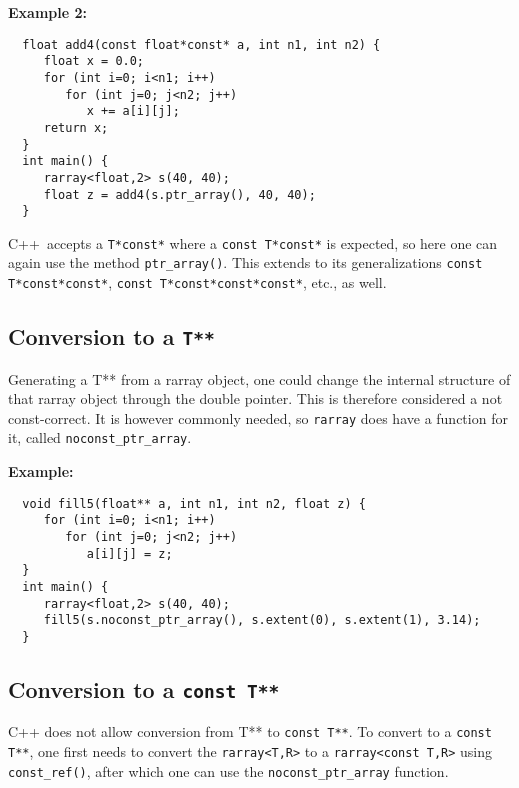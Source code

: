 \documentclass[11pt,twoside]{article}
\newcommand{\cxx}{C{++}}
\begin{document}
\noindent
{\bf Example 2:}
\vspace{-5pt}\begin{framed}\vspace{-14pt}%
\begin{verbatim}
  float add4(const float*const* a, int n1, int n2) {
     float x = 0.0;
     for (int i=0; i<n1; i++)
        for (int j=0; j<n2; j++)
           x += a[i][j];
     return x;
  }
  int main() {
     rarray<float,2> s(40, 40);
     float z = add4(s.ptr_array(), 40, 40);
  }
\end{verbatim}%
\vspace{-14pt}
\end{framed}

\noindent
\cxx\ accepts a \texttt{T*const*} where a \texttt{const T*const*} is expected, so here one can again use the method \texttt{ptr\_array()}.
This extends to its generalizations \texttt{const T*const*const*}, \texttt{const T*const*const*const*}, etc., as well.


\subsection{Conversion to a {\tt T**}}

\noindent
Generating a T** from a rarray object, one could change the internal structure of that rarray object through the double pointer.  This is therefore considered a not const-correct.  It is however commonly needed, so \texttt{rarray} does have a function for it, called \texttt{noconst\_ptr\_array}. 

\noindent
{\bf Example:}
\vspace{-5pt}\begin{framed}\vspace{-14pt}%
\begin{verbatim}
  void fill5(float** a, int n1, int n2, float z) {
     for (int i=0; i<n1; i++)
        for (int j=0; j<n2; j++)
           a[i][j] = z;
  }
  int main() {
     rarray<float,2> s(40, 40);
     fill5(s.noconst_ptr_array(), s.extent(0), s.extent(1), 3.14);
  }
\end{verbatim}%
\vspace{-14pt}
\end{framed}

\subsection{Conversion to a {\tt const T**}}
\noindent
C++ does not allow conversion from T** to \texttt{const T**}. To convert to a \texttt{const T**}, one first needs to convert the \texttt{rarray{\tt<}T,R{\tt>}} to a \texttt{rarray{\tt<}const T,R{\tt>}} using \texttt{const\_ref()}, after which one can use the \texttt{noconst\_ptr\_array} function.
\end{document}
